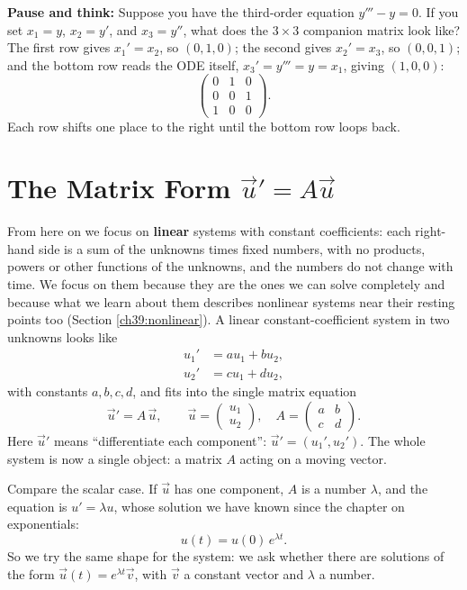 \begin{walkbox}
\textbf{Pause and think:} Suppose you have the third-order equation $y''' - y = 0$.
If you set $x_1 = y$, $x_2 = y'$, and $x_3 = y''$, what does the $3\times 3$
companion matrix look like? The first row gives $x_1' = x_2$, so $(0, 1, 0)$;
the second gives $x_2' = x_3$, so $(0, 0, 1)$; and the bottom row reads the ODE
itself, $x_3' = y''' = y = x_1$, giving $(1, 0, 0)$:
\[
  \begin{pmatrix} 0 & 1 & 0\\ 0 & 0 & 1\\ 1 & 0 & 0 \end{pmatrix}.
\]
Each row shifts one place to the right until the bottom row loops back.
\end{walkbox}

\section{The Matrix Form \texorpdfstring{$\vec{u}' = A\vec{u}$}{u' = Au}}
\label{ch39:matrixform}

From here on we focus on \textbf{linear} systems with constant coefficients:
each right-hand side is a sum of the unknowns times fixed numbers, with no
products, powers or other functions of the unknowns, and the numbers do not
change with time. We focus on them
because they are the ones we can solve completely and because what we learn
about them describes nonlinear systems near their resting points too (Section
\ref{ch39:nonlinear}). A linear constant-coefficient system in two unknowns
looks like
\[
  \begin{aligned}
    u_1' &= a u_1 + b u_2,\\
    u_2' &= c u_1 + d u_2,
  \end{aligned}
\]
with constants $a,b,c,d$, and fits into the single matrix equation
\[
  \boxed{\;\vec{u}' = A\,\vec{u}, \qquad
  \vec u = \begin{pmatrix} u_1 \\ u_2 \end{pmatrix}, \quad
  A = \begin{pmatrix} a & b \\ c & d \end{pmatrix}.\;}
\]
Here $\vec u'$ means ``differentiate each component'': $\vec u' = (u_1', u_2')$.
The whole system is now a single object: a matrix $A$ acting on a moving vector.

Compare the scalar case. If $\vec u$ has one component, $A$ is
a number $\lambda$, and the equation is $u' = \lambda u$, whose solution we
have known since the chapter on exponentials:
\[
  u(t) = u(0)\,e^{\lambda t}.
\]
So we try the same shape for the system: we ask whether there are solutions of
the form $\vec u(t) = e^{\lambda t}\vec v$, with $\vec v$ a constant vector and
$\lambda$ a number.

